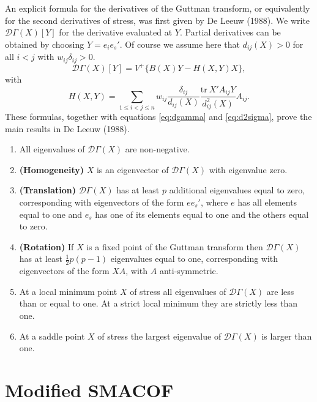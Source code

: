 \documentclass[
  12pt,
]{article}
\providecommand{\tightlist}{%
  \setlength{\itemsep}{0pt}\setlength{\parskip}{0pt}}
\begin{document}
An explicit formula for the derivatives of the Guttman transform, or equivalently for the second derivatives of stress, was first given by De Leeuw (1988). We write \(\mathcal{D}\Gamma(X)[Y]\) for the derivative evaluated at \(Y\). Partial derivatives can be obtained by choosing \(Y=e_ie_s'\). Of course we assume here that \(d_{ij}(X)>0\) for all
\(i<j\) with \(w_{ij}\delta_{ij}>0\).
\begin{equation}
\mathcal{D}\Gamma(X)[Y]=V^+\{B(X)Y-H(X,Y)X\},
\label{eq:dgammamat}
\end{equation}
with
\begin{equation}
H(X,Y)=\mathop{\sum}_{1\leq i<j\leq n}w_{ij}\frac{\delta_{ij}}{d_{ij}(X)}\frac{\text{tr}\ X'A_{ij}Y}{d_{ij}^2(X)}A_{ij}.
\label{eq:hdef}
\end{equation}
These formulas, together with equations \eqref{eq:dgamma} and \eqref{eq:d2sigma}, prove the main results in De Leeuw (1988).

\begin{enumerate}
\def\labelenumi{\arabic{enumi}.}
\tightlist
\item
  All eigenvalues of \(\mathcal{D}\Gamma(X)\) are non-negative.
\item
  \textbf{(Homogeneity)} \(X\) is an eigenvector of \(\mathcal{D}\Gamma(X)\) with eigenvalue zero.
\item
  \textbf{(Translation)} \(\mathcal{D}\Gamma(X)\) has at least \(p\) additional eigenvalues equal to zero, corresponding with eigenvectors of the form \(ee_s'\), where \(e\) has all elements equal to one and \(e_s\) has one of its elements equal to one and the others equal to zero.
\item
  \textbf{(Rotation)} If \(X\) is a fixed point of the Guttman transform then \(\mathcal{D}\Gamma(X)\) has at least \(\frac12 p(p-1)\) eigenvalues equal to one, corresponding with eigenvectors of the form \(XA\), with \(A\) anti-symmetric.
\item
  At a local minimum point \(X\) of stress all eigenvalues of \(\mathcal{D}\Gamma(X)\) are less than or equal to one. At a strict local minimum they are strictly less than one.
\item
  At a saddle point \(X\) of stress the largest eigenvalue of \(\mathcal{D}\Gamma(X)\) is larger than one.
\end{enumerate}

\section{Modified SMACOF}\label{modified-smacof}
\end{document}
